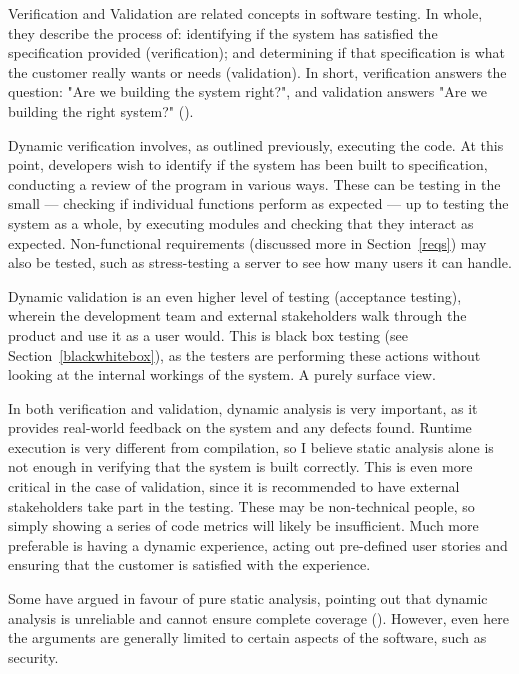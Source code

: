\documentclass[12pt]{article}
\begin{document}
Verification and Validation are related concepts in software testing. In whole, they describe the process of: identifying if the system has satisfied the specification provided (verification); and determining if that specification is what the customer really wants or needs (validation). In short, verification answers the question: "Are we building the system right?", and validation answers "Are we building the right system?" (). 

Dynamic verification involves, as outlined previously, executing the code. At this point, developers wish to identify if the system has been built to specification, conducting a review of the program in various ways. These can be testing in the small --- checking if individual functions perform as expected --- up to testing the system as a whole, by executing modules and checking that they interact as expected. Non-functional requirements (discussed more in Section~\ref{reqs}) may also be tested, such as stress-testing a server to see how many users it can handle.

Dynamic validation is an even higher level of testing (acceptance testing), wherein the development team and external stakeholders walk through the product and use it as a user would. This is black box testing (see Section~\ref{blackwhitebox}), as the testers are performing these actions without looking at the internal workings of the system. A purely surface view.

In both verification and validation, dynamic analysis is very important, as it provides real-world feedback on the system and any defects found. Runtime execution is very different from compilation, so I believe static analysis alone is not enough in verifying that the system is built correctly. This is even more critical in the case of validation, since it is recommended to have external stakeholders take part in the testing. These may be non-technical people, so simply showing a series of code metrics will likely be insufficient. Much more preferable is having a dynamic experience, acting out pre-defined user stories and ensuring that the customer is satisfied with the experience.

Some have argued in favour of pure static analysis, pointing out that dynamic analysis is unreliable and cannot ensure complete coverage (). However, even here the arguments are generally limited to certain aspects of the software, such as security. 
\end{document}
